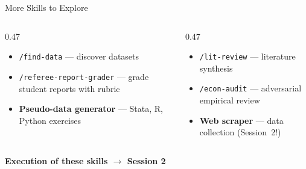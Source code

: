 \documentclass[aspectratio=169, 10pt]{beamer}
\begin{document}
\begin{frame}{More Skills to Explore}
\begin{columns}[T]
\begin{column}{0.47\textwidth}
\begin{tcolorbox}[keybox, title={\faChalkboard\quad Teaching Skills}]
\small
\begin{itemize}\setlength{\itemsep}{1pt}
  \item \texttt{/find-data} --- discover datasets
  \item \texttt{/referee-report-grader} --- grade student reports with rubric
  \item \textbf{Pseudo-data generator} --- Stata, R, Python exercises
\end{itemize}
\end{tcolorbox}
\end{column}
\begin{column}{0.47\textwidth}
\begin{tcolorbox}[keybox, title={\faSearch\quad Research Skills}]
\small
\begin{itemize}\setlength{\itemsep}{1pt}
  \item \texttt{/lit-review} --- literature synthesis
  \item \texttt{/econ-audit} --- adversarial empirical review
  \item \textbf{Web scraper} --- data collection (Session~2!)
\end{itemize}
\end{tcolorbox}
\end{column}
\end{columns}
\vskip8pt
\begin{tcolorbox}[accentbox, halign=center, width=8cm, top=3pt, bottom=3pt]
\small\bfseries Execution of these skills $\rightarrow$ Session 2
\end{tcolorbox}
\end{frame}
\end{document}
